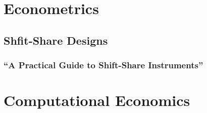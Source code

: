 \documentclass[11pt]{report}
\theoremstyle{definition}
\numberwithin{equation}{section}
\numberwithin{figure}{section}
\numberwithin{table}{section}
\begin{document}
\chapter{Econometrics}
\section{Shfit-Share Designs}
\subsection{``A Practical Guide to Shift-Share Instruments'' \\ \citep{Borusyak:2024}} 







\chapter{Computational Economics}



\end{document}
